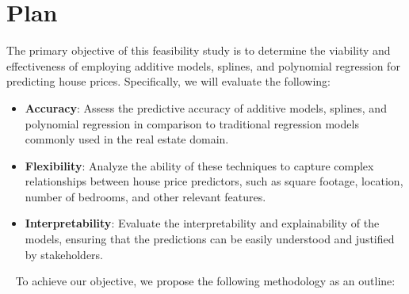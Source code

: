 \documentclass[aoas]{imsart}
\numberwithin{equation}{section}
\theoremstyle{plain}
\theoremstyle{remark}
\begin{document}
\hypertarget{plan}{%
\section{Plan}\label{plan}}

\hfill\break
The primary objective of this feasibility study is to determine the
viability and effectiveness of employing additive models, splines, and
polynomial regression for predicting house prices. Specifically, we will
evaluate the following:

\begin{itemize}
\item
  \textbf{Accuracy}: Assess the predictive accuracy of additive models,
  splines, and polynomial regression in comparison to traditional
  regression models commonly used in the real estate domain.
\item
  \textbf{Flexibility}: Analyze the ability of these techniques to
  capture complex relationships between house price predictors, such as
  square footage, location, number of bedrooms, and other relevant
  features.
\item
  \textbf{Interpretability}: Evaluate the interpretability and
  explainability of the models, ensuring that the predictions can be
  easily understood and justified by stakeholders.
\end{itemize}

~ To achieve our objective, we propose the following methodology as an
outline:
\end{document}

